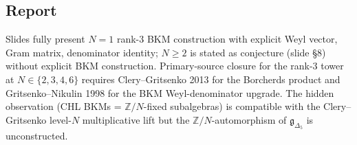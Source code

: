 \subsection*{Report}

Slides fully present $N=1$ rank-$3$ BKM construction with explicit
Weyl vector, Gram matrix, denominator identity; $N \geq 2$ is
stated as conjecture (slide \S 8) without explicit BKM construction.
Primary-source closure for the rank-$3$ tower at $N \in \{2,3,4,6\}$
requires Clery--Gritsenko 2013 for the Borcherds product and
Gritsenko--Nikulin 1998 for the BKM Weyl-denominator upgrade.
The hidden observation (CHL BKMs = $\mathbb{Z}/N$-fixed subalgebras)
is compatible with the Clery--Gritsenko level-$N$ multiplicative lift
but the $\mathbb{Z}/N$-automorphism of $\mathfrak{g}_{\Delta_5}$ is
unconstructed.
